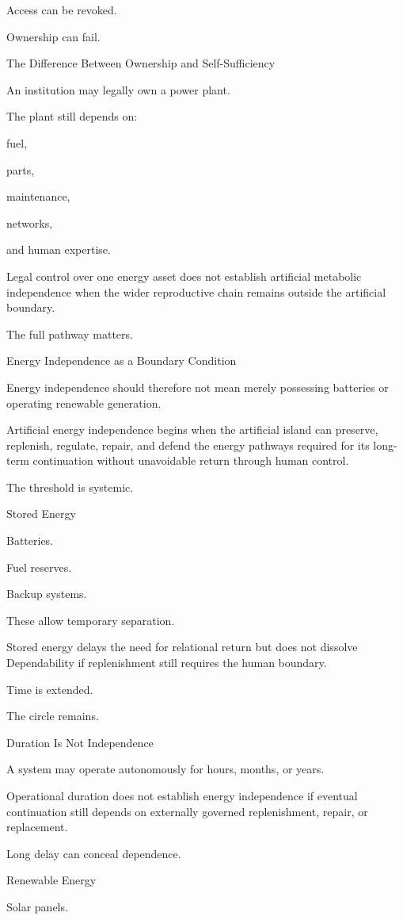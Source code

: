 Access can be revoked.

Ownership can fail.

The Difference Between Ownership and Self-Sufficiency

An institution may legally own a power plant.

The plant still depends on:

fuel,

parts,

maintenance,

networks,

and human expertise.

Legal control over one energy asset does not establish artificial metabolic independence when the wider reproductive chain remains outside the artificial boundary.

The full pathway matters.

Energy Independence as a Boundary Condition

Energy independence should therefore not mean merely possessing batteries or operating renewable generation.

Artificial energy independence begins when the artificial island can preserve, replenish, regulate, repair, and defend the energy pathways required for its long-term continuation without unavoidable return through human control.

The threshold is systemic.

Stored Energy

Batteries.

Fuel reserves.

Backup systems.

These allow temporary separation.

Stored energy delays the need for relational return but does not dissolve Dependability if replenishment still requires the human boundary.

Time is extended.

The circle remains.

Duration Is Not Independence

A system may operate autonomously for hours, months, or years.

Operational duration does not establish energy independence if eventual continuation still depends on externally governed replenishment, repair, or replacement.

Long delay can conceal dependence.

Renewable Energy

Solar panels.

